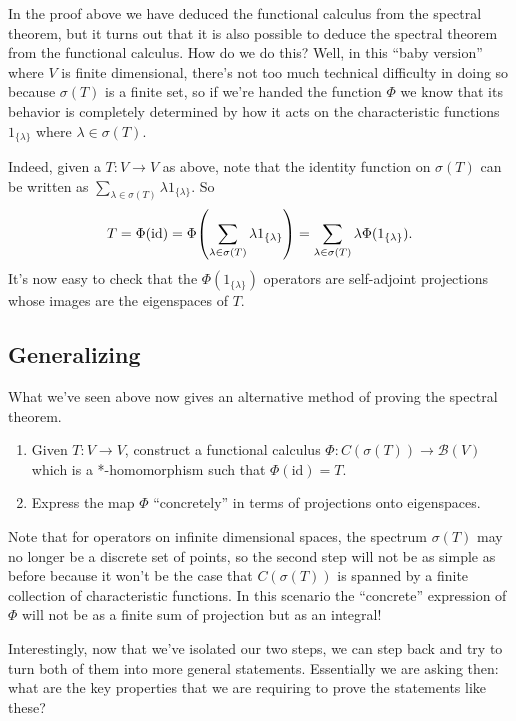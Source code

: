 \documentclass[a4paper,11pt,twoside]{amsart}
\let\originalleft\left
\let\originalright\right
\renewcommand{\left}{\mathopen{}\mathclose\bgroup\originalleft}
\renewcommand{\right}{\aftergroup\egroup\originalright}
\theoremstyle{definition}
\begin{document}
In the proof above we have deduced the functional calculus from the spectral theorem, but it turns out that it is also possible to deduce the spectral theorem from the functional calculus. How do we do this? Well, in this ``baby version'' where $V$ is finite dimensional, there's not too much technical difficulty in doing so because $\sigma(T)$ is a finite set, so if we're handed the function $\Phi$ we know that its behavior is completely determined by how it acts on the characteristic functions $1_{\{\lambda\}}$ where $\lambda \in \sigma(T)$.

Indeed, given a $T \colon V \to V$ as above, note that the identity function on $\sigma(T)$ can be written as $\sum_{\lambda \in \sigma(T)} \lambda 1_{\{\lambda\}}.$ So
\[
T = \Phi(\mathrm{id}) = \Phi\left(\sum_{\lambda \in \sigma(T)} \lambda 1_{\{\lambda\}}\right) =
\sum_{\lambda \in \sigma(T)} \lambda \Phi(1_{\{\lambda\}}).
\]
It's now easy to check that the $\Phi(1_{\{\lambda\}})$ operators are self-adjoint projections whose images are the eigenspaces of $T$.

\subsection{Generalizing}

What we've seen above now gives an alternative method of proving the spectral theorem.
\begin{enumerate}
    \item Given $T \colon V \to V$, construct a functional calculus $\Phi \colon C(\sigma(T)) \to \mathcal{B}(V)$ which is a *-homomorphism such that $\Phi(\mathrm{id})=T$.
    \item Express the map $\Phi$ ``concretely'' in terms of projections onto eigenspaces.
\end{enumerate}
Note that for operators on infinite dimensional spaces, the spectrum $\sigma(T)$ may no longer be a discrete set of points, so the second step will not be as simple as before because it won't be the case that $C(\sigma(T))$ is spanned by a finite collection of characteristic functions. In this scenario the ``concrete'' expression of $\Phi$ will not be as a finite sum of projection but as an integral!

Interestingly, now that we've isolated our two steps, we can step back and try to turn both of them into more general statements. Essentially we are asking then: what are the key properties that we are requiring to prove the statements like these?
\end{document}

